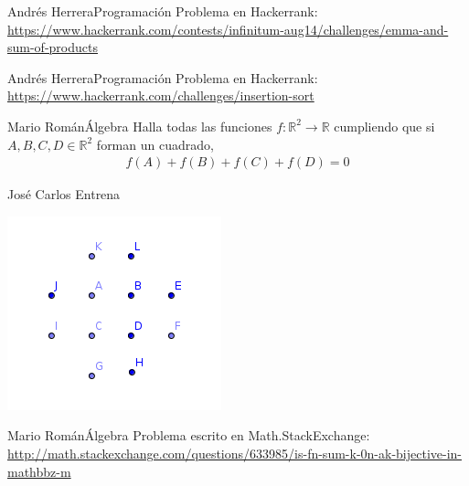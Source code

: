 \documentclass[a4paper, 11pt]{article} %
\numberwithin{prbcounter}{section}
\begin{document}
  
  
  \begin{enunciado}{Andrés Herrera}{Programación}
    Problema en Hackerrank:
    \url{https://www.hackerrank.com/contests/infinitum-aug14/challenges/emma-and-sum-of-products}
  \end{enunciado}

  
  
  
  \begin{enunciado}{Andrés Herrera}{Programación}
    Problema en Hackerrank:
    \url{https://www.hackerrank.com/challenges/insertion-sort}
  \end{enunciado}
    
    
  
  \begin{enunciado}{Mario Román}{Álgebra}
    Halla todas las funciones $f: \mathbb{R}^2 \rightarrow \mathbb{R}$ cumpliendo
    que si $A,B,C,D \in \mathbb{R}^2$ forman un cuadrado,
    \begin{gather*}
      f(A) + f(B) + f(C) + f(D) = 0
    \end{gather*}
  \end{enunciado}
  
  \begin{solucion}{José Carlos Entrena}
    \begin{center}
      \includegraphics{problema6.png}
    \end{center}
  \end{solucion}

  
  \begin{enunciado}{Mario Román}{Álgebra}
    Problema escrito en Math.StackExchange:
    \url{http://math.stackexchange.com/questions/633985/is-fn-sum-k-0n-ak-bijective-in-mathbbz-m}
  \end{enunciado}
\end{document}
